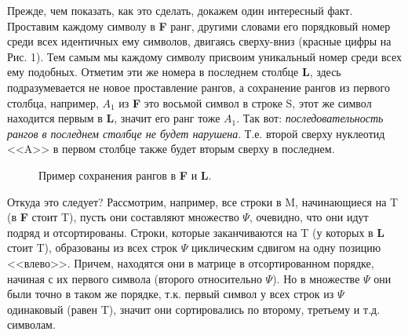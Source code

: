 \documentclass[letterpaper, 11pt]{article}
\begin{document}
Прежде, чем показать, как это сделать, докажем один интересный факт. Проставим каждому символу в \textbf{F} ранг, другими словами его порядковый номер среди всех идентичных ему символов, двигаясь сверху-вниз (красные цифры на Рис. 1). Тем самым мы каждому символу присвоим уникальный номер среди всех ему подобных. Отметим эти же номера в последнем столбце \textbf{L}, здесь подразумевается не новое проставление рангов, а сохранение рангов из первого столбца, например, $A_1$ из \textbf{F} это восьмой символ в строке S, этот же символ находится первым в \textbf{L}, значит его ранг тоже $A_1$. Так вот: \textit{последовательность рангов в последнем столбце не будет нарушена}. Т.е. второй сверху нуклеотид <<A>> в первом столбце также будет вторым сверху в последнем.
\begin{figure}[H]
  \caption{Пример сохранения рангов в \textbf{F} и \textbf{L}.}
\end{figure}

Откуда это следует? Рассмотрим, например, все строки в M, начинающиеся на T (в \textbf{F} стоит T), пусть они составляют множество {$\Psi$}, очевидно, что они идут подряд и отсортированы. Строки, которые заканчиваются на T (у которых в \textbf{L} стоит T), образованы из всех строк $\Psi$ циклическим сдвигом на одну позицию <<влево>>. Причем, находятся они в матрице в отсортированном порядке, начиная с их первого символа (второго относительно $\Psi$). Но в множестве $\Psi$ они были точно в таком же порядке, т.к. первый символ у всех строк из $\Psi$ одинаковый (равен T), значит они сортировались по второму, третьему и т.д. символам.
\end{document}
